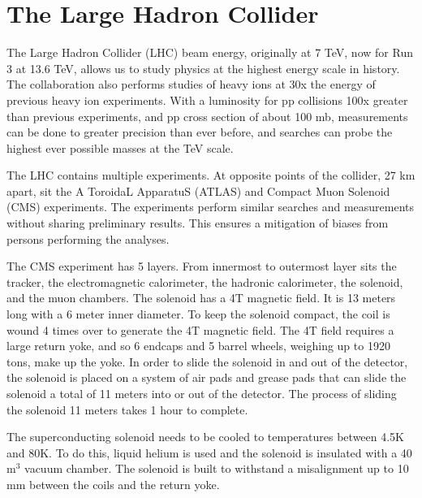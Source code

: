 \vspace{-3pt}
\section{The Large Hadron Collider}\label{sec:ch3:lhc}

The Large Hadron Collider (LHC) beam energy, originally at 7 TeV, now for Run 3 at 13.6 TeV, allows us to study physics at the highest energy scale in history. The collaboration also performs studies of heavy ions at 30x the energy of previous heavy ion experiments. With a luminosity for pp collisions 100x greater than previous experiments, and pp cross section of about 100 mb, measurements can be done to greater precision than ever before, and searches can probe the highest ever possible masses at the TeV scale.

The LHC contains multiple experiments. At opposite points of the collider, 27 km apart, sit the A ToroidaL ApparatuS (ATLAS) and Compact Muon Solenoid (CMS) experiments. The experiments perform similar searches and measurements without sharing preliminary results. This ensures a mitigation of biases from persons performing the analyses.

The CMS experiment has 5 layers. From innermost to outermost layer sits the tracker, the electromagnetic calorimeter, the hadronic calorimeter, the solenoid, and the muon chambers. The solenoid has a 4T magnetic field. It is 13 meters long with a 6 meter inner diameter. To keep the solenoid compact, the coil is wound 4 times over to generate the 4T magnetic field. The 4T field requires a large return yoke, and so 6 endcaps and 5 barrel wheels, weighing up to 1920 tons, make up the yoke. In order to slide the solenoid in and out of the detector, the solenoid is placed on a system of air pads and grease pads that can slide the solenoid a total of 11 meters into or out of the detector. The process of sliding the solenoid 11 meters takes 1 hour to complete.

The superconducting solenoid needs to be cooled to temperatures between 4.5K and 80K. To do this, liquid helium is used and the solenoid is insulated with a 40 m$^3$ vacuum chamber. The solenoid is built to withstand a misalignment up to 10 mm between the coils and the return yoke.
